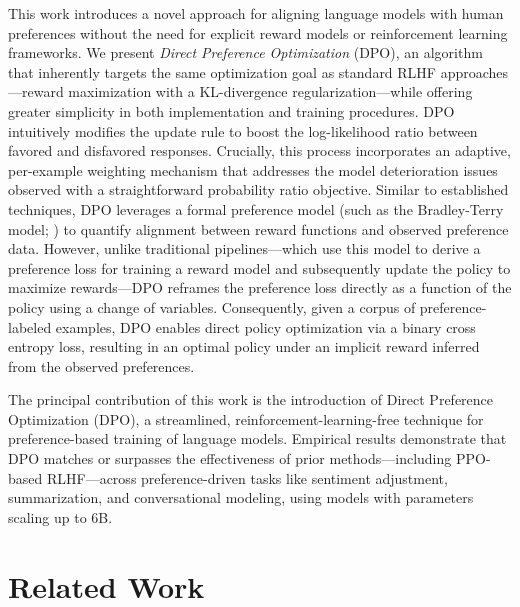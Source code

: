 This work introduces a novel approach for aligning language models with human preferences without the need for explicit reward models or reinforcement learning frameworks. We present \textit{Direct Preference Optimization} (DPO), an algorithm that inherently targets the same optimization goal as standard RLHF approaches—reward maximization with a KL-divergence regularization—while offering greater simplicity in both implementation and training procedures. DPO intuitively modifies the update rule to boost the log-likelihood ratio between favored and disfavored responses. Crucially, this process incorporates an adaptive, per-example weighting mechanism that addresses the model deterioration issues observed with a straightforward probability ratio objective. Similar to established techniques, DPO leverages a formal preference model (such as the Bradley-Terry model; \cite{bradley1952rankanalysis}) to quantify alignment between reward functions and observed preference data. However, unlike traditional pipelines—which use this model to derive a preference loss for training a reward model and subsequently update the policy to maximize rewards—DPO reframes the preference loss directly as a function of the policy using a change of variables. Consequently, given a corpus of preference-labeled examples, DPO enables direct policy optimization via a binary cross entropy loss, resulting in an optimal policy under an implicit reward inferred from the observed preferences.

The principal contribution of this work is the introduction of Direct Preference Optimization (DPO), a streamlined, reinforcement-learning-free technique for preference-based training of language models. Empirical results demonstrate that DPO matches or surpasses the effectiveness of prior methods—including PPO-based RLHF—across preference-driven tasks like sentiment adjustment, summarization, and conversational modeling, using models with parameters scaling up to 6B.

\section{Related Work}

